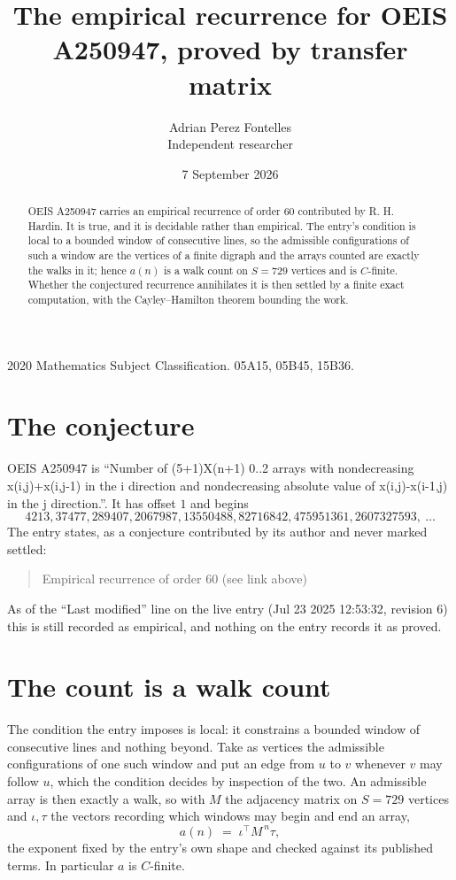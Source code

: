\documentclass[11pt,a4paper]{article}
\title{The empirical recurrence for OEIS A250947, proved by transfer matrix}
\author{Adrian Perez Fontelles\\ \small Independent researcher}
\date{7 September 2026}
\theoremstyle{plain}
\theoremstyle{definition}
\begin{document}
\maketitle

\begin{abstract}
OEIS A250947 carries an empirical recurrence of order $60$ contributed by R. H. Hardin. It is
true, and it is decidable rather than empirical. The entry's condition is local to a bounded window of consecutive lines, so
the admissible configurations of such a window are the vertices of a finite digraph and the
arrays counted are exactly the walks in it; hence $a(n)$ is a walk count on $S=729$ vertices
and is $C$-finite. Whether the conjectured recurrence annihilates it is then settled by a
finite exact computation, with the Cayley--Hamilton theorem bounding the work.
\end{abstract}

\noindent\small 2020 Mathematics Subject Classification. 05A15, 05B45, 15B36.\normalsize

\section{The conjecture}

OEIS A250947 is ``Number of (5+1)X(n+1) 0..2 arrays with nondecreasing x(i,j)+x(i,j-1) in the i direction and nondecreasing absolute value of x(i,j)-x(i-1,j) in the j direction.''. It has offset $1$ and begins
\[
4213, 37477, 289407, 2067987, 13550488, 82716842, 475951361, 2607327593,\ \dots
\]
The entry states, as a conjecture contributed by its author and never marked settled:
\begin{quote}
Empirical recurrence of order 60 (see link above)
\end{quote}
As of the ``Last modified'' line on the live entry (Jul 23 2025 12:53:32, revision 6) this is still
recorded as empirical, and nothing on the entry records it as proved.

\section{The count is a walk count}

The condition the entry imposes is local: it constrains a bounded window of consecutive lines and nothing beyond. Take as
vertices the admissible configurations of one such window and put an edge from $u$ to $v$
whenever $v$ may follow $u$, which the condition decides by inspection of the two. An
admissible array is then exactly a walk, so with $M$ the adjacency matrix on $S=729$ vertices
and $\iota,\tau$ the vectors recording which windows may begin and end an array,
\[
a(n)\;=\;\iota^{\!\top}M^{\,n}\tau ,
\]
the exponent fixed by the entry's own shape and checked against its published terms. In
particular $a$ is $C$-finite.
\end{document}
